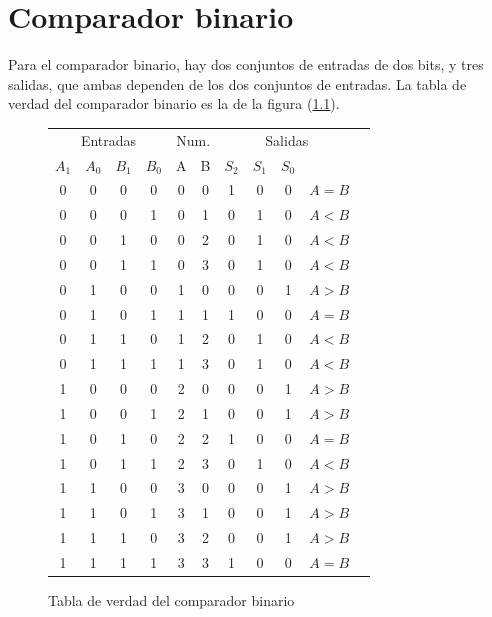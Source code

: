 \documentclass[]{informeutn}
\begin{document}
  \chapter{Comparador binario}
    Para el comparador binario, hay dos conjuntos de entradas de dos bits, y tres salidas, que ambas dependen de los
    dos conjuntos de entradas. La tabla de verdad del comparador binario es la de la figura (\ref{tt.bin.comp}).
    \begin{figure}[!ht]
      \centering
      \begin{tabular}{|c|c|c|c|c|c||c|c|c|c|c|}
        \hline
        \multicolumn{4}{|c}{Entradas} & \multicolumn{2}{|c||}{Num.} & \multicolumn{4}{c|}{Salidas} \\
        $A_1$ & $A_0$ & $B_1$ & $B_0$ & A & B & $S_2$ & $S_1$ & $S_0$ &\\
        \hline
        0     & 0     & 0     & 0     & 0 & 0 & 1     & 0     & 0     & $A=B$\\
        0     & 0     & 0     & 1     & 0 & 1 & 0     & 1     & 0     & $A<B$\\
        0     & 0     & 1     & 0     & 0 & 2 & 0     & 1     & 0     & $A<B$\\
        0     & 0     & 1     & 1     & 0 & 3 & 0     & 1     & 0     & $A<B$\\
        0     & 1     & 0     & 0     & 1 & 0 & 0     & 0     & 1     & $A>B$\\
        0     & 1     & 0     & 1     & 1 & 1 & 1     & 0     & 0     & $A=B$\\
        0     & 1     & 1     & 0     & 1 & 2 & 0     & 1     & 0     & $A<B$\\
        0     & 1     & 1     & 1     & 1 & 3 & 0     & 1     & 0     & $A<B$\\
        1     & 0     & 0     & 0     & 2 & 0 & 0     & 0     & 1     & $A>B$\\
        1     & 0     & 0     & 1     & 2 & 1 & 0     & 0     & 1     & $A>B$\\
        1     & 0     & 1     & 0     & 2 & 2 & 1     & 0     & 0     & $A=B$\\
        1     & 0     & 1     & 1     & 2 & 3 & 0     & 1     & 0     & $A<B$\\
        1     & 1     & 0     & 0     & 3 & 0 & 0     & 0     & 1     & $A>B$\\
        1     & 1     & 0     & 1     & 3 & 1 & 0     & 0     & 1     & $A>B$\\
        1     & 1     & 1     & 0     & 3 & 2 & 0     & 0     & 1     & $A>B$\\
        1     & 1     & 1     & 1     & 3 & 3 & 1     & 0     & 0     & $A=B$\\
        \hline
      \end{tabular}
      \caption{Tabla de verdad del comparador binario}
      \label{tt.bin.comp}
    \end{figure}
\end{document}
